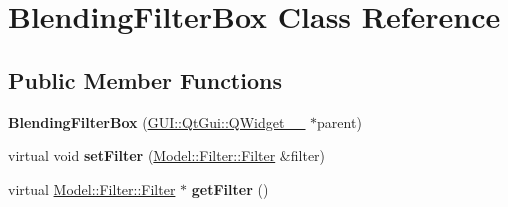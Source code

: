 \hypertarget{classGUI_1_1BlendingFilterBox}{}\section{Blending\+Filter\+Box Class Reference}
\label{classGUI_1_1BlendingFilterBox}
\subsection*{Public Member Functions}
\begin{DoxyCompactItemize}
\item 
\hypertarget{classGUI_1_1BlendingFilterBox_af3447f81dcf10eeb386828a51effd38f}{}{\bfseries Blending\+Filter\+Box} (\hyperlink{classGUI_1_1QtGui_1_1QWidget____10}{G\+U\+I\+::\+Qt\+Gui\+::\+Q\+Widget\+\_\+\+\_} $\ast$parent)\label{classGUI_1_1BlendingFilterBox_af3447f81dcf10eeb386828a51effd38f}

\item 
\hypertarget{classGUI_1_1BlendingFilterBox_ad7c0ee00fe3faac7942d75eec2a5342b}{}virtual void {\bfseries set\+Filter} (\hyperlink{classModel_1_1Filter_1_1Filter}{Model\+::\+Filter\+::\+Filter} \&filter)\label{classGUI_1_1BlendingFilterBox_ad7c0ee00fe3faac7942d75eec2a5342b}

\item 
\hypertarget{classGUI_1_1BlendingFilterBox_acef2029a93f4ab3a538cdb643b9c2613}{}virtual \hyperlink{classModel_1_1Filter_1_1Filter}{Model\+::\+Filter\+::\+Filter} $\ast$ {\bfseries get\+Filter} ()\label{classGUI_1_1BlendingFilterBox_acef2029a93f4ab3a538cdb643b9c2613}

\end{DoxyCompactItemize}
